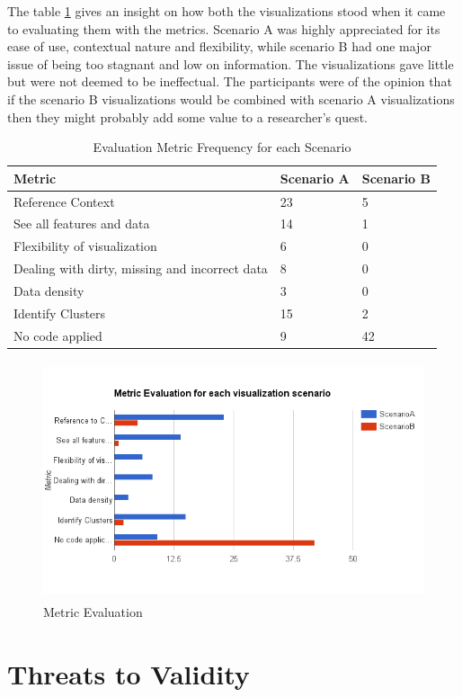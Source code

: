 \documentclass[double,12pt]{beavtex}
\begin{document}
The table \ref{tab:freq} gives an insight on how both the visualizations stood when it came to evaluating them with the metrics. Scenario A was highly appreciated for its ease of use, contextual nature and flexibility, while scenario B had one major issue of being too stagnant and low on information. The visualizations gave little but were not deemed to be ineffectual. The participants were of the opinion that if the scenario B visualizations would be combined with scenario A visualizations then they might probably add some value to a researcher's quest.

\begin{table}[H]
\centering
\begin{tabular}{ |p{5cm}|p{3cm}|p{3cm}|  }
 \hline
Metric & Scenario A & Scenario B\\
 \hline
 Reference Context & 23 & 5\\ \hline
 See all features and data & 14 & 1\\ \hline
 Flexibility of visualization & 6 & 0\\ \hline
 Dealing with dirty, missing and incorrect data & 8 & 0\\ \hline
 Data density & 3 & 0\\ \hline
 Identify Clusters & 15 & 2\\ \hline
 No code applied & 9 & 42\\ 
 \hline
\end{tabular}
\caption{Evaluation Metric Frequency for each Scenario}
\label{tab:freq}
\end{table}

\begin{figure}[!ht]
\centering
\includegraphics[width=140mm,height=70mm]{metric.png}
\caption{Metric Evaluation}
\end{figure}

\chapter{Threats to Validity}
\end{document}
